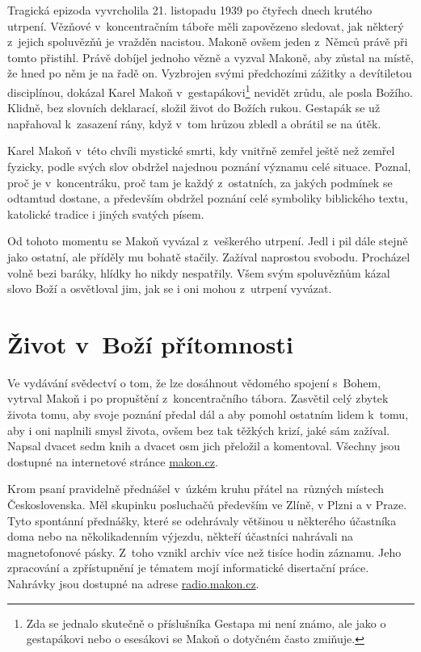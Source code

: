 Tragická epizoda vyvrcholila 21. listopadu 1939 po čtyřech dnech krutého utrpení. Vězňové
v~koncentračním táboře měli zapovězeno sledovat, jak některý z~jejich spoluvězňů
je vražděn nacistou. Makoně ovšem jeden z~Němců právě při tomto přistihl. Právě
dobíjel jednoho vězně a vyzval Makoně, aby zůstal na místě, že hned po něm je na
řadě on. Vyzbrojen svými předchozími zážitky a devítiletou disciplínou, dokázal
Karel Makoň v~gestapákovi\footnote{Zda se jednalo skutečně o příslušníka Gestapa
mi není známo, ale jako o gestapákovi nebo o esesákovi se Makoň o dotyčném často
zmiňuje.} nevidět zrůdu, ale posla Božího. Klidně, bez slovních deklarací,
složil život do Božích rukou. Gestapák se už napřahoval k~zasazení rány, když
v~tom hrůzou zbledl a obrátil se na útěk.

Karel Makoň v~této chvíli mystické smrti, kdy vnitřně zemřel ještě než zemřel
fyzicky, podle svých slov obdržel najednou poznání významu celé situace. Poznal,
proč je v~koncentráku, proč tam je každý z~ostatních, za jakých podmínek se
odtamtud dostane, a především obdržel poznání celé symboliky biblického textu,
katolické tradice i jiných svatých písem.

Od tohoto momentu se Makoň vyvázal z~veškerého utrpení. Jedl i pil dále stejně
jako ostatní, ale příděly mu bohatě stačily. Zažíval naprostou svobodu.
Procházel volně bezi baráky, hlídky ho nikdy nespatřily. Všem svým spoluvězňům
kázal slovo Boží a osvětloval jim, jak se i oni mohou z~utrpení vyvázat.

\section{Život v~Boží přítomnosti}

Ve vydávání svědectví o tom, že lze dosáhnout vědomého spojení s~Bohem, vytrval
Makoň i po propuštění z~koncentračního tábora. Zasvětil celý zbytek života tomu,
aby svoje poznání předal dál a aby pomohl ostatním lidem k~tomu, aby i oni
naplnili smysl života, ovšem bez tak těžkých krizí, jaké sám zažíval. Napsal
dvacet sedm knih a dvacet osm jich přeložil a komentoval. Všechny jsou dostupné
na internetové stránce \url{makon.cz}.

Krom psaní pravidelně přednášel v~úzkém kruhu přátel na~různých místech
Československa. Měl skupinku posluchačů především ve Zlíně, v Plzni a v Praze.
Tyto spontánní přednášky, které se odehrávaly většinou u některého účastníka
doma nebo na několikadenním výjezdu, někteří účastníci nahrávali na
magnetofonové pásky. Z~toho vznikl archiv více než tisíce hodin záznamu. Jeho
zpracování a zpřístupnění je tématem mojí informatické disertační
práce\cite{kruuza2021iterativni}. Nahrávky jsou dostupné na adrese
\url{radio.makon.cz}.

